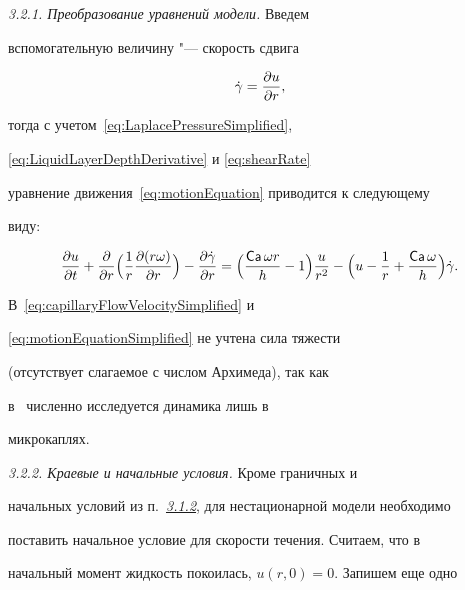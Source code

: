 \textit{3.2.1. Преобразование уравнений модели.} Введем

вспомогательную величину "--- скорость сдвига

\begin{equation}\label{eq:shearRate}

\dgamma  = \frac{\partial u}{\partial r},

\end{equation}

тогда с учетом~\eqref{eq:LaplacePressureSimplified},

\eqref{eq:LiquidLayerDepthDerivative} и \eqref{eq:shearRate}

уравнение движения~\eqref{eq:motionEquation} приводится к следующему

виду:

\begin{equation}\label{eq:motionEquationSimplified}

 \frac{\partial u}{\partial t} +

 \frac{\partial }{\partial r}

 \Bigl( \frac{1}{r}\frac{\partial (r\omega )}{\partial r} \Bigr)

 - \frac{\partial \dgamma }{\partial r} = \Bigl(\frac{\Ca \omega r}{h} - 1 \Bigr)\frac{u}{r^2} -

 \Bigl(u - \frac{1}{r} + \frac{\Ca \omega }{h} \Bigr)\dgamma .

\end{equation}

В~\eqref{eq:capillaryFlowVelocitySimplified} и

\eqref{eq:motionEquationSimplified} не учтена сила тяжести

(отсутствует слагаемое с числом Архимеда), так как

в~\cite{Fischer2002} численно исследуется динамика лишь в

микрокаплях.



\smallskip



\hypertarget{kol:3.2.2}{}



\textit{3.2.2. Краевые и начальные условия.} Кроме граничных и

начальных условий из п.~\hyperlink{kol:3.1.2}{{\it 3.1.2}\/}, для нестационарной модели необходимо

поставить начальное условие для скорости течения. Считаем, что в

начальный момент жидкость покоилась, $u(r, 0) = 0$. Запишем еще одно

